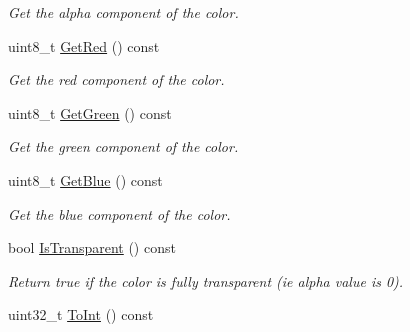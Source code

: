 \begin{DoxyCompactItemize}
\begin{DoxyCompactList}\small\item\em Get the alpha component of the color. \end{DoxyCompactList}\item 
\hypertarget{classTmx_1_1Color_ac188b64dda182848df9469ee549bb26a}{uint8\-\_\-t \hyperlink{classTmx_1_1Color_ac188b64dda182848df9469ee549bb26a}{Get\-Red} () const }\label{classTmx_1_1Color_ac188b64dda182848df9469ee549bb26a}

\begin{DoxyCompactList}\small\item\em Get the red component of the color. \end{DoxyCompactList}\item 
\hypertarget{classTmx_1_1Color_a82a3f08a25d58d2d2f244a8347cf0bce}{uint8\-\_\-t \hyperlink{classTmx_1_1Color_a82a3f08a25d58d2d2f244a8347cf0bce}{Get\-Green} () const }\label{classTmx_1_1Color_a82a3f08a25d58d2d2f244a8347cf0bce}

\begin{DoxyCompactList}\small\item\em Get the green component of the color. \end{DoxyCompactList}\item 
\hypertarget{classTmx_1_1Color_ab3dd06474d6403dbf9bd6bcd0d28a70a}{uint8\-\_\-t \hyperlink{classTmx_1_1Color_ab3dd06474d6403dbf9bd6bcd0d28a70a}{Get\-Blue} () const }\label{classTmx_1_1Color_ab3dd06474d6403dbf9bd6bcd0d28a70a}

\begin{DoxyCompactList}\small\item\em Get the blue component of the color. \end{DoxyCompactList}\item 
\hypertarget{classTmx_1_1Color_aed77854b09267887bd289f4622e831d1}{bool \hyperlink{classTmx_1_1Color_aed77854b09267887bd289f4622e831d1}{Is\-Transparent} () const }\label{classTmx_1_1Color_aed77854b09267887bd289f4622e831d1}

\begin{DoxyCompactList}\small\item\em Return true if the color is fully transparent (ie alpha value is 0). \end{DoxyCompactList}\item 
\hypertarget{classTmx_1_1Color_a20ae331f91f72ca3db0068508a7b0317}{uint32\-\_\-t \hyperlink{classTmx_1_1Color_a20ae331f91f72ca3db0068508a7b0317}{To\-Int} () const }\label{classTmx_1_1Color_a20ae331f91f72ca3db0068508a7b0317}


\end{DoxyCompactItemize}
